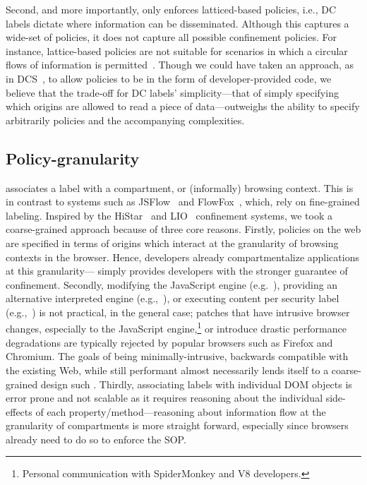 Second, and more importantly, \sys{} only enforces latticed-based
policies, i.e., DC labels dictate where information can be
disseminated.
%
Although this captures a wide-set of policies, it does not capture all
possible confinement policies.
%
For instance, lattice-based policies are not suitable for scenarios in
which a circular flows of information is permitted~\cite{Badger:1995}.
%
Though we could have taken an approach, as in DCS~\cite{Akhawe2013},
to allow policies to be in the form of developer-provided code, we
believe that the trade-off for DC labels' simplicity---that of simply
specifying which origins are allowed to read a piece of
data---outweighs the ability to specify arbitrarily policies and the
accompanying complexities.


\subsection{Policy-granularity}
\label{sec:discussion:granularity}

\sys{} associates a label with a compartment, or (informally) browsing
context.
%
This is in contrast to systems such as JSFlow~\cite{Hedin:2012} and
FlowFox~\cite{DeGroef:2012}, which, rely on fine-grained labeling.
%
Inspired by the HiStar~ and
LIO~ confinement systems, we took a coarse-grained
approach because of three core reasons.
%
Firstly, policies on the web are specified in terms of origins which
interact at the granularity of browsing contexts in the browser.
%
Hence, developers already compartmentalize applications at this
granularity---\sys{} simply provides developers with the stronger
guarantee of confinement.
%
Secondly, modifying the JavaScript engine (e.g.~),
providing an alternative interpreted engine (e.g.,~\cite{Hedin:2012}),
or executing content per security label (e.g.,~\cite{DeGroef:2012}) is
not practical, in the general case;
patches that have intrusive browser changes, especially to the
JavaScript engine,\footnote{
  Personal communication with SpiderMonkey and V8 developers.
} or introduce drastic performance degradations are typically rejected
by popular browsers such as Firefox and Chromium.
%
The goals of being minimally-intrusive, backwards compatible with the
existing Web, while still performant almost necessarily lends itself
to a coarse-grained design such \sys{}.
%
Thirdly, associating labels with individual DOM objects is error
prone and not scalable as it requires reasoning about the individual
side-effects of each property/method---reasoning about information
flow at the granularity of compartments is more straight forward,
especially since browsers already need to do so to enforce the SOP.

